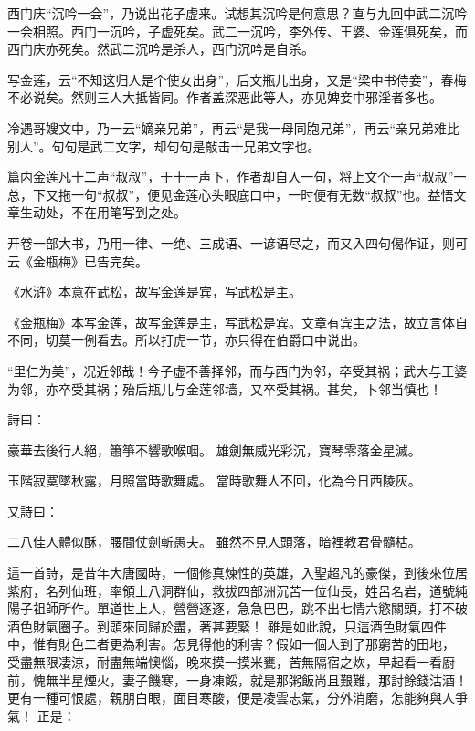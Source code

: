 \begin{showcontents}{}
{西门庆“沉吟一会”，乃说出花子虚来。试想其沉吟是何意思？直与九回中武二沉吟一会相照。西门一沉吟，子虚死矣。武二一沉吟，李外传、王婆、金莲俱死矣，而西门庆亦死矣。然武二沉吟是杀人，西门沉吟是自杀。

写金莲，云“不知这归人是个使女出身”，后文瓶儿出身，又是“梁中书侍妾”，春梅不必说矣。然则三人大抵皆同。作者盖深恶此等人，亦见婢妾中邪淫者多也。

冷遇哥嫂文中，乃一云“嫡亲兄弟”，再云“是我一母同胞兄弟”，再云“亲兄弟难比别人”。句句是武二文字，却句句是敲击十兄弟文字也。

篇内金莲凡十二声“叔叔”，于十一声下，作者却自入一句，将上文个一声“叔叔”一总，下又拖一句“叔叔”，便见金莲心头眼底口中，一时便有无数“叔叔”也。益悟文章生动处，不在用笔写到之处。

开卷一部大书，乃用一律、一绝、三成语、一谚语尽之，而又入四句偈作证，则可云《金瓶梅》已告完矣。

《水浒》本意在武松，故写金莲是宾，写武松是主。

《金瓶梅》本写金莲，故写金莲是主，写武松是宾。文章有宾主之法，故立言体自不同，切莫一例看去。所以打虎一节，亦只得在伯爵口中说出。

“里仁为美”，况近邻哉！今子虚不善择邻，而与西门为邻，卒受其祸；武大与王婆为邻，亦卒受其祸；殆后瓶儿与金莲邻墙，又卒受其祸。甚矣，卜邻当慎也！

} %

詩曰：

豪華去後行人絕，簫箏不響歌喉咽。
雄劍無威光彩沉，寶琴零落金星滅。

玉階寂寞墜秋露，月照當時歌舞處。
當時歌舞人不回，化為今日西陵灰。

又詩曰：

二八佳人體似酥，腰間仗劍斬愚夫。
雖然不見人頭落，暗裡教君骨髓枯。

這一首詩，是昔年大唐國時，一個修真煉性的英雄，入聖超凡的豪傑，到後來位居紫府，名列仙班，率領上八洞群仙，救拔四部洲沉苦一位仙長，姓呂名岩，道號純陽子祖師所作。單道世上人，營營逐逐，急急巴巴，跳不出七情六慾關頭，打不破酒色財氣圈子。到頭來同歸於盡，著甚要緊！
雖是如此說，只這酒色財氣四件中，惟有財色二者更為利害。怎見得他的利害？假如一個人到了那窮苦的田地，
受盡無限凄涼，耐盡無端懊惱，晚來摸一摸米甕，苦無隔宿之炊，早起看一看廚前，愧無半星煙火，妻子饑寒，一身凍餒，就是那粥飯尚且艱難，那討餘錢沽酒！
更有一種可恨處，親朋白眼，面目寒酸，便是凌雲志氣，分外消磨，怎能夠與人爭氣！
正是：


\end{showcontents}
